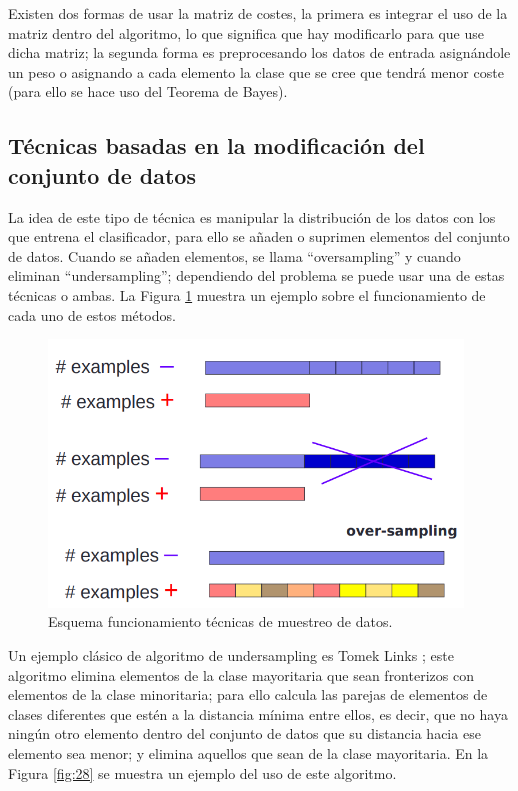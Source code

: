 Existen dos formas de usar la matriz de costes, la primera es integrar el uso de la matriz dentro del algoritmo, lo que significa que hay modificarlo para que use dicha matriz; la segunda forma es preprocesando los datos de entrada asignándole un peso o asignando a cada elemento la clase que se cree que tendrá menor coste (para ello se hace uso del Teorema de Bayes).

\subsection{Técnicas basadas en la modificación del conjunto de datos}
La idea de este tipo de técnica es manipular la distribución de los datos con los que entrena el clasificador, para ello se añaden o suprimen elementos del conjunto de datos. Cuando se añaden elementos, se llama “oversampling” y cuando eliminan “undersampling”; dependiendo del problema se puede usar una de estas técnicas o ambas. La Figura \ref{fig:27} muestra un ejemplo sobre el funcionamiento de cada uno de estos métodos.\newline
\newpage
\begin{figure}[H]
	\centering
	\includegraphics[width=110mm]{imagenes/oversampling_undersampling.png}
	\caption{Esquema funcionamiento técnicas de muestreo de datos.}
	\label{fig:27}
\end{figure}
\verticalspace

Un ejemplo clásico de algoritmo de undersampling es Tomek Links \cite{tomek1976two}; este algoritmo elimina elementos de la clase mayoritaria que sean fronterizos con elementos de la clase minoritaria; para ello calcula las parejas de elementos de clases diferentes que estén a la distancia mínima entre ellos, es decir, que no haya ningún otro elemento dentro del conjunto de datos que su distancia hacia ese elemento sea menor; y elimina aquellos que sean de la clase mayoritaria. En la Figura \ref{fig:28} se muestra un ejemplo del uso de este algoritmo.\newline


